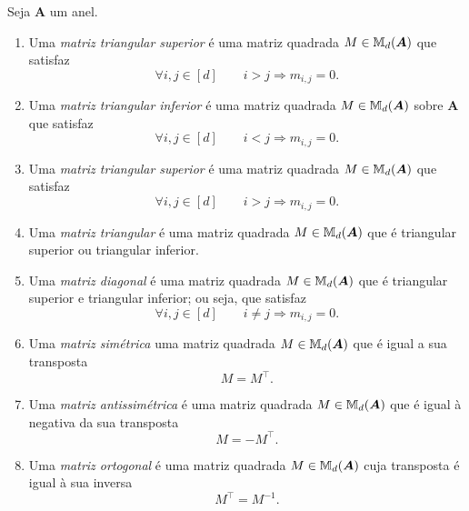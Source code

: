 \begin{definition}
	Seja $\bm A$ um anel.
	\begin{enumerate}
	\item Uma \emph{matriz triangular superior} é uma matriz quadrada $M \in \mathbb{M}_d(\bm A)$ que satisfaz
		\begin{equation*}
		\forall i,j \in [d] \qquad i > j \Rightarrow m_{i,j}=0.
		\end{equation*}
	\item Uma \emph{matriz triangular inferior} é uma matriz quadrada $M \in \mathbb{M}_d(\bm A)$ sobre $\bm A$ que satisfaz
		\begin{equation*}
		\forall i,j \in [d] \qquad i < j \Rightarrow m_{i,j}=0.
		\end{equation*}
	\item Uma \emph{matriz triangular superior} é uma matriz quadrada $M \in \mathbb{M}_d(\bm A)$ que satisfaz
		\begin{equation*}
		\forall i,j \in [d] \qquad i > j \Rightarrow m_{i,j}=0.
		\end{equation*}
	\item Uma \emph{matriz triangular} é uma matriz quadrada $M \in \mathbb{M}_d(\bm A)$ que é triangular superior ou triangular inferior.
	\item Uma \emph{matriz diagonal} é uma matriz quadrada $M \in \mathbb{M}_d(\bm A)$ que é triangular superior e triangular inferior; ou seja, que satisfaz
		\begin{equation*}
		\forall i,j \in [d] \qquad i \neq j \Rightarrow m_{i,j}=0.
		\end{equation*}
	\item Uma \emph{matriz simétrica}  uma matriz quadrada $M \in \mathbb{M}_d(\bm A)$ que é igual a sua transposta
		\begin{equation*}
		M = M^\intercal.
		\end{equation*}
	\item Uma \emph{matriz antissimétrica} é uma matriz quadrada $M \in \mathbb{M}_d(\bm A)$ que é igual à negativa da sua transposta
		\begin{equation*}
		M = -M^\intercal.
		\end{equation*}
	\item Uma \emph{matriz ortogonal} é uma matriz quadrada $M \in \mathbb{M}_d(\bm A)$ cuja transposta é igual à sua inversa
		\begin{equation*}
		M^\intercal = M^{-1}.
		\end{equation*}
	\end{enumerate}
\end{definition}

